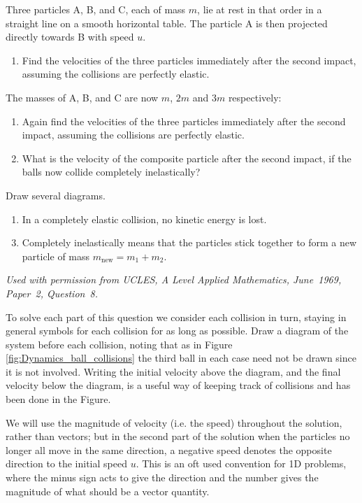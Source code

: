 
\begin{hint}[A1969AMIIQ8l] %
{Three particles A, B, and C, each of mass $m$, lie at rest in that order in a straight line on a smooth horizontal table. The particle A is then projected directly towards B with speed $u$. 
\begin{enumerate}
	\item Find the velocities of the three particles immediately after the second impact, assuming the collisions are perfectly elastic.
\end{enumerate}
The masses of A, B, and C are now $m$, $2m$ and $3m$ respectively:
\begin{enumerate}[resume]
	\item Again find the velocities of the three particles immediately after the second impact, assuming the collisions are perfectly elastic.
	\item What is the velocity of the composite particle after the second impact, if the balls now collide completely inelastically?
\end{enumerate}
}
{Draw several diagrams.
\begin{enumerate}
	\item In a completely elastic collision, no kinetic energy is lost.
\end{enumerate}
\begin{enumerate} \setcounter{enumi}{2}
	\item Completely inelastically means that the particles stick together to form a new particle of mass $m_{\text{new}} = m_{1} + m_{2}$.
\end{enumerate}
}
{\textit{Used with permission from UCLES, A Level Applied Mathematics, June~1969, Paper~2, Question~8.}}
{To solve each part of this question we consider each collision in turn, staying in general symbols for each collision for as long as possible. Draw a diagram of the system before each collision, noting that as in Figure \ref{fig:Dynamics_ball_collisions} the third ball in each case need not be drawn since it is not involved. Writing the initial velocity above the diagram, and the final velocity below the diagram, is a useful way of keeping track of collisions and has been done in the Figure. 

We will use the magnitude of velocity (i.e. the speed) throughout the solution, rather than vectors; but in the second part of the solution when the particles no longer all move in the same direction, a negative speed denotes the opposite direction to the initial speed $u$. This is an oft used convention for 1D problems, where the minus sign acts to give the direction and the number gives the magnitude of what should be a vector quantity.

}
\end{hint}
